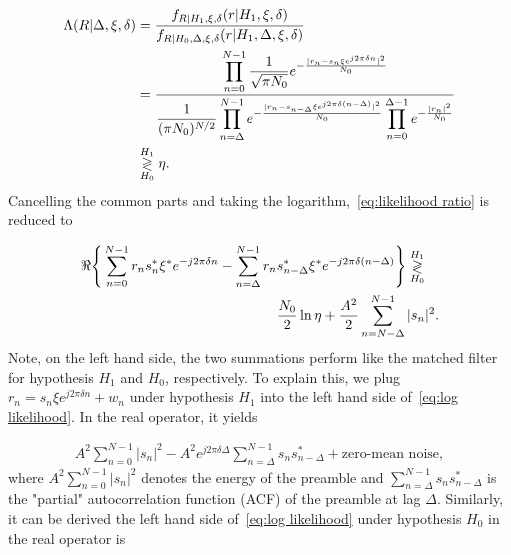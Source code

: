 \begin{equation}
    \label{eq:likelihood ratio}
    \begin{aligned}
    \Lambda(R|\Delta,\xi,\delta)&=\frac{f_{R|H_1,\xi,\delta}(r|H_1,\xi,\delta)}{f_{R|H_0,\Delta,\xi,\delta}(r|H_1,\Delta,\xi,\delta)} \\
    &=\frac{\displaystyle \prod_{n=0}^{N-1}\frac{1}{\sqrt{\pi N_0}}e^{-\frac{|r_n-s_n\xi e^{j2\pi\delta n}|^2}{N_0}}}{\displaystyle \frac{1}{(\pi N_0)^{N/2}}\prod_{n=\Delta}^{N-1}e^{-\frac{|r_n-s_{n-\Delta}\xi e^{j2\pi\delta (n-\Delta)}|^2}{N_0}}\prod_{n=0}^{\Delta-1}e^{-\frac{|r_n|^2}{N_0}}} \\
    & \mathrel{\mathop\gtrless\limits^{H_1}_{H_0}} \eta.
    \end{aligned}
  \end{equation}
Cancelling the common parts and taking the logarithm,~\eqref{eq:likelihood ratio} is reduced to

\begin{equation}
    \label{eq:log likelihood}
    \begin{aligned}
    \Re\Bigg\{\sum_{n=0}^{N-1}r_ns_n^*\xi^*e^{-j2\pi\delta n}-\sum_{n=\Delta}^{N-1}r_n&s_{n-\Delta}^*\xi^*e^{-j2\pi\delta(n-\Delta)}\Bigg\} \mathrel{\mathop\gtrless\limits^{H_1}_{H_0}} \\
    &\frac{N_0}{2}\ln\eta+\frac{A^2}{2}\sum_{n=N-\Delta}^{N-1}|s_n|^2.
    \end{aligned}
\end{equation}
Note, on the left hand side, the two summations perform like the matched filter for hypothesis $H_1$
and $H_0$, respectively. To explain this, we plug $r_n=s_n\xi e^{j2\pi\delta n}+w_n$ under hypothesis $H_1$ into the left hand side of~\eqref{eq:log likelihood}.
In the real operator, it yields

\begin{equation}
    \label{eq:log likelihood under H_1}
    \begin{aligned}
    A^2\sum_{n=0}^{N-1}|s_n|^2-A^2e^{j2\pi\delta\Delta}\sum_{n=\Delta}^{N-1}s_ns_{n-\Delta}^*+\text{zero-mean noise},
    \end{aligned}
\end{equation}
where $A^2\sum_{n=0}^{N-1}|s_n|^2$ denotes the energy of the preamble and
$\sum_{n=\Delta}^{N-1}s_ns_{n-\Delta}^*$ is the "partial" autocorrelation function (ACF) of the
preamble at lag $\Delta$. Similarly, it can be derived the left hand side of~\eqref{eq:log likelihood}
under hypothesis $H_0$ in the real operator is 

